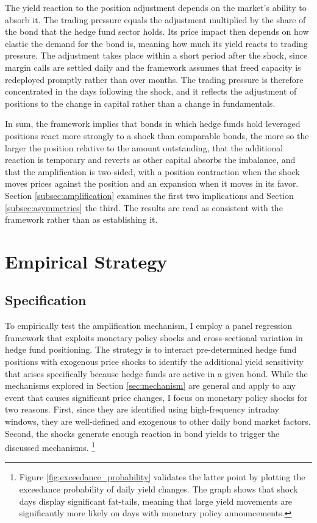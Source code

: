 \documentclass[english, 11pt, oneside]{article}
\begin{document}
The yield reaction to the position adjustment depends on the market's ability to absorb it. The trading pressure equals the adjustment multiplied by the share of the bond that the hedge fund sector holds. Its price impact then depends on how elastic the demand for the bond is, meaning how much its yield reacts to trading pressure. The adjustment takes place within a short period after the shock, since margin calls are settled daily and the framework assumes that freed capacity is redeployed promptly rather than over months. The trading pressure is therefore concentrated in the days following the shock, and it reflects the adjustment of positions to the change in capital rather than a change in fundamentals.

In sum, the framework implies that bonds in which hedge funds hold leveraged positions react more strongly to a shock than comparable bonds, the more so the larger the position relative to the amount outstanding, that the additional reaction is temporary and reverts as other capital absorbs the imbalance, and that the amplification is two-sided, with a position contraction when the shock moves prices against the position and an expansion when it moves in its favor. Section \ref{subsec:amplification} examines the first two implications and Section \ref{subsec:asymmetries} the third. The results are read as consistent with the framework rather than as establishing it.







\section{Empirical Strategy}
\label{sec:empirical_strategy}

\subsection{Specification}
To empirically test the amplification mechanism, I employ a panel regression framework that exploits monetary policy shocks and cross-sectional variation in hedge fund positioning. The strategy is to interact pre-determined hedge fund positions with exogenous price shocks to identify the additional yield sensitivity that arises specifically because hedge funds are active in a given bond.
While the mechanisms explored in Section \ref{sec:mechanism} are general and apply to any event that causes significant price changes, I focus on monetary policy shocks for two reasons. First, since they are identified using high-frequency intraday windows, they are well-defined and exogenous to other daily bond market factors. Second, the shocks generate enough reaction in bond yields to trigger the discussed mechanisms. \footnote{Figure \ref{fig:exceedance_probability} validates the latter point by plotting the exceedance probability of daily yield changes. The graph shows that shock days display significant fat-tails, meaning that large yield movements are significantly more likely on days with monetary policy announcements.}  
\end{document}
